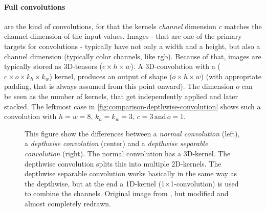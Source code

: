\paragraph{Full convolutions} are the kind of convolutions, for that the kernels \emph{channel} dimension $c$ matches the channel dimension of the input values.
Images - that are one of the primary targets for convolutions - typically have not only a width and a height, but also a channel dimension (typically color channels, like rgb).
Because of that, images are typically stored as 3D-tensors ($c \times h \times w$).
A 3D-convolution with a ($c \times o \times k_h \times k_w$) kernel, produces an output of shape ($o \times h \times w$) (with appropriate padding, that is always assumed from this point onward).
The dimension $o$ can be seen as the number of kernels, that get independently applied and later stacked.
The leftmost case in \autoref{fig:comparison-depthwise-convolution} shows such a convolution with $h = w=8,\, k_h =k_w = 3,\, c = 3 \mathrm{\,and\,} o=1$.

\begin{figure}[htbp]
    \centering
    \caption{This figure show the differences between a \emph{normal convolution} (left), a \emph{depthwise convolution}  (center) and a \emph{depthwise separable convolution} (right).
    The normal convolution has a 3D-kernel. The depthwise convolution splits this into multiple 2D-kernels.
    The depthwise separable convolution works basically in the same way as the depthwise, but at the end a 1D-kernel (1$\times$1-convolution) is used to combine the channels.
     Original image from \cite{separableConvolutions}, but modified and almost completely redrawn.}
    \label{fig:comparison-depthwise-convolution}
\end{figure}

